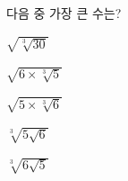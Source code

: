 다음 중 가장 큰 수는?
\begin{choices32}{\rule[-3ex]{0pt}{8ex}$\sqrt{\sqrt[3]{30}}$}{\rule[-3ex]{0pt}{8ex}$\sqrt{6\times\sqrt[3]{5}}$}{\rule[-3ex]{0pt}{8ex}$\sqrt{5\times\sqrt[3]{6}}$}{\rule[-3ex]{0pt}{8ex}$\sqrt[3]{5\sqrt{6}}$}{\rule[-3ex]{0pt}{8ex}$\sqrt[3]{6\sqrt{5}}$}\end{choices32}

